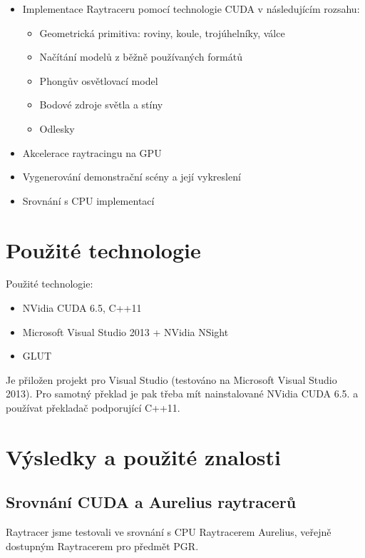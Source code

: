 \documentclass[12pt,a4paper,titlepage,final]{report}
\begin{document}
\begin{itemize}
	\item Implementace Raytraceru pomocí technologie CUDA v následujícím rozsahu:
	\begin{itemize}
		\item Geometrická primitiva: roviny, koule, trojúhelníky, válce
		\item Načítání modelů z běžně používaných formátů
		\item Phongův osvětlovací model
		\item Bodové zdroje světla a stíny
		\item Odlesky
	\end{itemize}
	\item Akcelerace raytracingu na GPU
	\item Vygenerování demonstrační scény a její vykreslení
	\item Srovnání s CPU implementací
\end{itemize}

\section{Použité technologie}

Použité technologie:

\begin{itemize}
	\item NVidia CUDA 6.5, C++11
	\item Microsoft Visual Studio 2013 + NVidia NSight
	\item GLUT
\end{itemize}

Je přiložen projekt pro Visual Studio (testováno na Microsoft Visual Studio 2013). Pro samotný překlad je pak třeba mít nainstalované NVidia CUDA 6.5. a používat překladač podporující C++11.

\section{Výsledky a použité znalosti}

\subsection{Srovnání CUDA a Aurelius raytracerů}

Raytracer jsme testovali ve srovnání s CPU Raytracerem Aurelius, veřejně dostupným Raytracerem pro předmět PGR.
\end{document}
